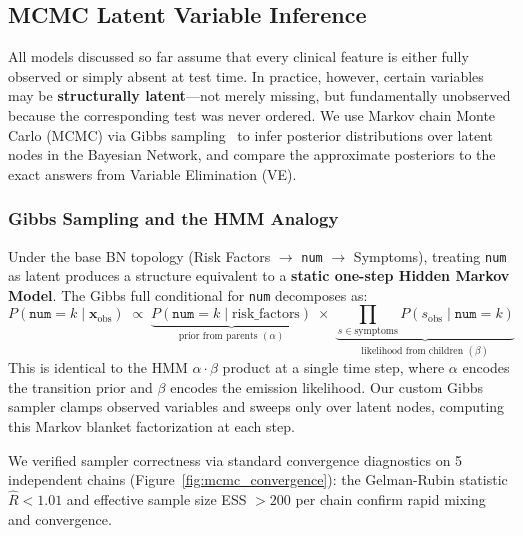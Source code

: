 
\subsection{MCMC Latent Variable Inference}

All models discussed so far assume that every clinical feature is either fully observed or simply absent at test time. In practice, however, certain variables may be \textbf{structurally latent}---not merely missing, but fundamentally unobserved because the corresponding test was never ordered. We use Markov chain Monte Carlo (MCMC) via Gibbs sampling~\cite{koller2009pgm} to infer posterior distributions over latent nodes in the Bayesian Network, and compare the approximate posteriors to the exact answers from Variable Elimination (VE).

\subsubsection{Gibbs Sampling and the HMM Analogy}

Under the base BN topology (Risk Factors $\rightarrow$ \texttt{num} $\rightarrow$ Symptoms), treating \texttt{num} as latent produces a structure equivalent to a \textbf{static one-step Hidden Markov Model}. The Gibbs full conditional for \texttt{num} decomposes as:
\begin{equation}
    P(\texttt{num}\!=\!k \mid \mathbf{x}_{\text{obs}}) \;\propto\; \underbrace{P(\texttt{num}\!=\!k \mid \text{risk\_factors})}_{\text{prior from parents } (\alpha)} \;\times\; \underbrace{\prod_{s \in \text{symptoms}} P(s_{\text{obs}} \mid \texttt{num}\!=\!k)}_{\text{likelihood from children } (\beta)}
\end{equation}
This is identical to the HMM $\alpha \cdot \beta$ product at a single time step, where $\alpha$ encodes the transition prior and $\beta$ encodes the emission likelihood. Our custom Gibbs sampler clamps observed variables and sweeps only over latent nodes, computing this Markov blanket factorization at each step.

We verified sampler correctness via standard convergence diagnostics on 5 independent chains (Figure~\ref{fig:mcmc_convergence}): the Gelman-Rubin statistic $\hat{R} < 1.01$ and effective sample size ESS $> 200$ per chain confirm rapid mixing and convergence.

